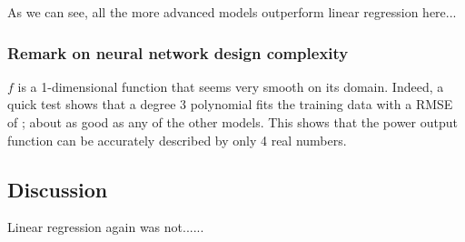 \documentclass[11pt]{article}
\begin{document}
As we can see, all the more advanced models outperform linear regression here...


\subsubsection*{Remark on neural network design complexity}
$f$ is a 1-dimensional function that seems very smooth on its domain.
Indeed, a quick test shows that a degree 3 polynomial fits the training data with a RMSE of ; about as good as any of the other models.
This shows that the power output function can be accurately described by only 4 real numbers.


\clearpage




\subsection*{Discussion}

Linear regression again was not......



\printbibliography
\end{document}

